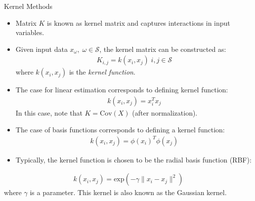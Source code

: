 \documentclass[9pt]{beamer}
\begin{document}
\begin{frame}{Kernel Methods}
\begin{itemize}
\item Matrix $K$ is known as kernel matrix and captures interactions in input variables. 
\item Given input data $x_\omega,\; \omega \in \mathcal{S}$, the kernel matrix can be constructed as:
\begin{align*}
K_{i,j}=k(x_i,x_j)\; i,j\in \mathcal{S}
\end{align*}
where $k(x_i,x_j)$ is the {\em kernel function}. 
\item The case for linear estimation corresponds to defining kernel function:
\begin{align*}
k(x_i,x_j)=x_i^Tx_j
\end{align*}
In this case, note that $K=\textrm{Cov}(X)$ (after normalization). 
\item The case of basis functions corresponds to defining a kernel function:
\begin{align*}
k(x_i,x_j)=\phi(x_i)^T\phi(x_j)
\end{align*}
\item Typically, the kernel function is chosen to be the radial basis function (RBF):
\end{itemize}
\begin{align*}
k(x_i,x_j)=\textrm{exp}(-\gamma\|x_i-x_j\|^2)
\end{align*}
where $\gamma$ is a parameter. This kernel is also known as the Gaussian kernel.  
\end{frame}

\end{document}
